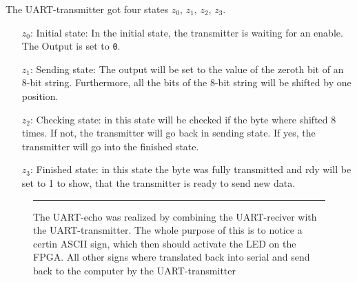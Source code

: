 The UART-transmitter got four states $z_0$, $z_1$, $z_2$, $z_3$.
\begin{itemize}


\item[$z_0$:] Initial state: In the initial state, the transmitter is waiting for an enable. The Output is set to \verb+0+.
\item[$z_1$:] Sending state: The output will be set to the value of the zeroth bit of an 8-bit string. Furthermore, all the bits of the 8-bit string will be shifted by one position.
\item[$z_2$:] Checking state: in this state will be checked if the byte where shifted 8 times. If not, the transmitter will go back in sending state. If yes, the transmitter will go into the finished state.
\item[$z_3$:] Finished state: in this state the byte was fully transmitted and rdy will be set to 1 to show, that the transmitter is ready to send new data.

\end{itemize}\newpage

\begin{figure}[h!]
    \begin{center}
        
        \caption{The UART-echo was realized by combining the UART-reciver with the UART-transmitter. The whole purpose of this is to notice a certin ASCII sign, which then should activate the LED on the FPGA. All other signs where translated back into serial and send back to the computer by the UART-transmitter}
        \label{fig:as1-schematic}
        \vspace{1em}\hrule
    \end{center}
\end{figure}
